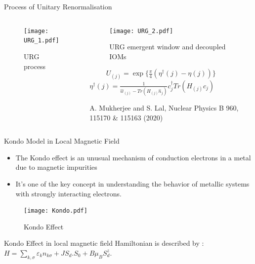 \documentclass{beamer}
\begin{document}
\begin{frame}{Process of Unitary Renormalisation}
\begin{columns}[c]
\begin{column}{.6\textwidth}
\begin{figure}[!ht]
    \centering
    \texttt{[image: URG\_1.pdf]}
    \caption{URG process }
\end{figure}
\end{column}
\begin{column}{.6\textwidth}
\begin{figure}[!ht]
    \centering
    \texttt{[image: URG\_2.pdf]}
    \caption{URG emergent window and decoupled IOMs}
\end{figure}
 $ \hspace{1cm} U_{(j)}  = \exp \{\frac{\pi}{4}(\eta^\dagger(j) - \eta(j)) \} $ \\
 $\eta^\dagger(j) = \frac{1}{\hat{w}_{(j)} - Tr(H_{(j)} \hat{n}_{j})} c_j^\dagger Tr(H_{(j)}c_j)  $
 \vspace{0.2cm}
 
 {\small \textcolor{mLightGreen}{ \hspace{5mm} A. Mukherjee and S. Lal, Nuclear Physics B 960, 115170 \& 115163 (2020)}}
\end{column}
\end{columns}
\end{frame}



\begin{frame}{Kondo Model in Local Magnetic Field}
\begin{itemize}
\item The Kondo effect is an unusual mechanism of conduction electrons in a metal due to magnetic impurities
\item  It's one of the key concept in understanding the behavior of metallic systems with strongly interacting electrons.
\end{itemize}
\begin{figure}[!ht]
    \centering
    \texttt{[image: Kondo.pdf]}
    \caption{Kondo Effect}
\end{figure}
Kondo Effect in local magnetic field Hamiltonian is described by :\\ $H = \sum_{k,\sigma} \varepsilon_k n_{k \sigma} + J S_d. S_0  + B \mu_B S_d^z$. \\
\end{frame}
\end{document}
